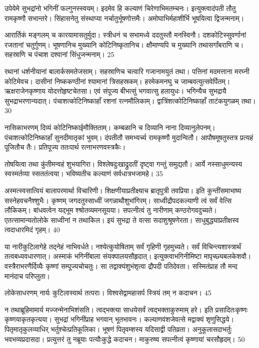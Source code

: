   उपेयेमे सुभद्रांनो भगिनीं फल्गुनस्स्वयम्।
 इदमेव हि कल्याणं चिरेणाभिमतम्चनः।
 इत्युक्त्वादंपती तौतु रामकृष्णौ सभान्तरे।
 सिंहासनेतु संस्थाप्या नर्चातुर्भूषणोत्तमैः।
 अमोघाभिर्महाशीर्भि भूषयित्वा द्विजन्मनाम्।
 
आरार्तिकं मङ्गलम् च कारयामासतुर्मुदा।
 स्त्रीधनं च सभामध्ये ददतुस्तौ मनस्विनौ।
 दशकोटिस्सुवर्णानां रजतानां चतुर्गुणम्।
 भूषणानिच मुख्यानि कोटिनिष्कृतानिच।
 क्षौमाण्यपि च मुख्यानि तथासर्गांबराणि च।
 सहस्राणि च पंचाश दश्वानां सिंधुजन्मनाम्।
 25

  रथानां धर्शनीयानां बालार्कसमतेजसाम्।
 सहस्राणिच चत्वारि गजानामयुतं तथा।
 पत्तिनां मदमत्ताना मरघ्नी कोटिमेवच।
 दासीनां निष्ककण्ठीनां श्यामानां त्रिसहस्रकम्।
 हरमेकमनघु च जाम्बवत्युत्सवेर्पितम्।
 ऋक्षराजेनकृष्णाय योदत्तोहृष्टचेतसा।
 एवं संपूज्य बीभत्सुं भगवात्सु हलायुधः।
 भगिन्यैच सुभद्रायै सुभद्राभरणान्यदात्।
 पंचाशत्कोटिनिष्काहाँ रशनां रत्नमौलिकाम्।
 द्वात्रिंशत्कोटिनिष्काहाँ ताटंकयुगळम् तथा।
 30

  नासिकाभरणम् दिव्यं कोटिनिष्काईमौक्तिताम्।
 कम्बळानि च दिव्यानि नाना दिव्यानुलेपनम्।
 पंचाशत्कोटिनिष्काहाँ सुनदीमातृकां भुवम्।
 दंपतीतौ समभ्यर्च्य रामकृष्णौ मुदान्वितौ।
 आपौषमूषतुस्तत्र प्रत्यहं पूजितौच तैः।
 प्रतिपूज्य ततःपार्थ रत्नाभरणवस्त्रकैः।
 
तोषयित्वा तथा कुंतीमन्वहं शुभयागिरा।
 विश्लेषदुःखाद्रुदतीं दृष्ट्वा गन्तुं समुद्यतौ।
 आर्ये नस्साधुमन्यस्य स्वस्मर्तव्या स्सततंत्वया।
 भविष्यतीच कल्याणं सर्वधात्रभजामहे।
 35

  अस्मत्स्वसात्वियं बालापरमार्था विचारिणी।
 शिक्षणीयाप्रतीक्ष्याच ब्रातृपुत्री तवप्रिया।
 इति कुन्तींसमाभाष्य सस्नेहवचनैश्शुभैः।
 कृष्णम् जगदतुस्साध्वीं जगन्नाथौशुभांगिरम्।
 साध्वीद्रौपदकल्याणी त्वं सर्वं वेत्सि लौकिकम्।
 बांधवत्वेन यद्भूम श्श्रोतव्यमनसूयया।
 सपत्नीत्वं तु नारीणाम् कण्ठरोगवदुच्यते।
 एतत्सामान्यतोलोके साध्वीनां न तथाकिल।
 इयं सुभद्रा ते वत्सा सदाशुश्रूषणेरता।
 साधुबुद्ध्याप्रतीक्षस्व त्वदाधारमिदं गृहम्।
 40

  या नारीकुटिलागेहे तद्नेहं नाभिवर्धते।
 नश्येत्कुयोषिताम् सर्वं गृहिणी गृहमुच्यते।
 सर्वं विचिन्त्यशास्त्रार्थं तत्वबध्यवधारणात्।
 अस्माकं भगिनींबाला संयक्पालयसौहृदात्।
 इत्युक्त्वाभगिनीमिष्टा मापृच्छ्यबलकेशवौ।
 वस्त्रैराभरणैर्दिव्यैः कृष्णां सम्पूज्यचोचतुः।
 सा तद्वाक्यंशुभंशृत्वा द्रौपदी पतिदेवता।
 सस्मितंप्राह तौ मन्द मानंदाच परिप्लुता।
 
लोकेसाधरणम् नार्यः कुटिलास्वार्थ तत्पराः।
 विश्वसेद्वामहासर्प स्त्रियं तम् न कदाचन।
 45

  न तथाब्रूहिमामार्य मज्जन्मेनाभिशंसति।
 त्वद्भक्त्या साधयेसर्वं त्वद्भक्ताकुरुमाम् हरे।
 इति प्रसादितःकृष्णः कृष्णयाकृतकृत्यया।
 सुभद्रां भगिनींप्राह भगवान् भूतभावनः।
 कल्याणवंशजेवत्से मद्वाक्यं शृणुसिद्धये।
 पितृमातृकुलव्याधिर् भर्तुश्चेत्प्रतिकूलिका।
 भूषणं पितृवम्शस्य यदिसाद्वी पतिव्रता।
 अनुकूलासदाभर्तुः भवभव्यप्रदासदा।
 प्रत्युत्तरं तु नब्रूयाः पत्यौःकुद्धे कदाचन।
 माकुरुष्व सपत्नीत्वं कृष्णायां चरसौहृदम्।
 50

